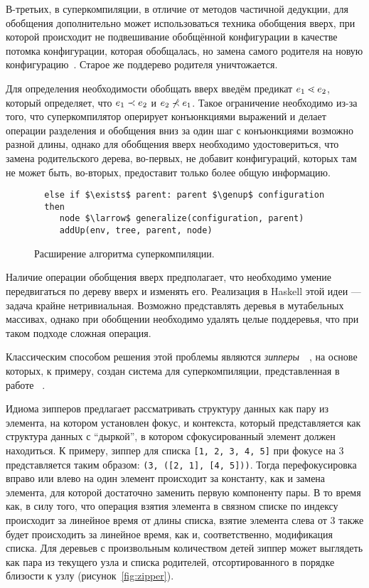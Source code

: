 
В-третьих, в суперкомпиляции, в отличие от методов частичной дедукции, для обобщения дополнительно может использоваться
техника обобщения вверх, при которой происходит не подвешивание обобщённой конфигурации
в качестве потомка конфигурации, которая обобщалась, но замена самого родителя на
новую конфигурацию~\cite{scPos}. Старое же поддерево родителя уничтожается.

Для определения необходимости обобщать вверх введём предикат $e_1 \lessdot e_2$,
который определяет, что $e_1 \prec e_2$ и $e_2 \not\prec e_1$.
Такое ограничение необходимо из-за того, что суперкомпилятор оперирует
конъюнкциями выражений и делает операции разделения и обобщения вниз
за один шаг с конъюнкциями возможно разной длины, однако для обобщения
вверх необходимо удостовериться, что замена родительского дерева, во-первых,
не добавит конфигураций, которых там не может быть, во-вторых, предоставит
только более общую информацию.

\begin{figure}[h!]
\begin{lstlisting}
  else if $\exists$ parent: parent $\genup$ configuration
  then
     node $\larrow$ generalize(configuration, parent)
     addUp(env, tree, parent, node)
\end{lstlisting}
\caption{Расширение алгоритма суперкомпиляции.}
\label{fig:scalgogenExtended}
\end{figure}

Наличие операции обобщения вверх предполагает, что необходимо умение передвигаться по дереву вверх и изменять его.
Реализация в Haskell этой идеи --- задача крайне нетривиальная. Возможно представлять
деревья в мутабельных массивах, однако при обобщении необходимо удалять целые поддеревья,
что при таком подходе сложная операция.

Классическим способом решения этой проблемы являются \emph{зипперы}~~\cite{zipper},
на основе которых, к примеру, создан система для суперкомпиляции,
представленная в работе ~\cite{optimus}.

Идиома зипперов предлагает рассматривать структуру данных как пару из элемента,
на котором установлен фокус, и контекста, который представляется как структура данных
с ``дыркой'', в котором сфокусированный элемент должен находиться.
К примеру, зиппер для списка \lstinline{[1, 2, 3, 4, 5]} при фокусе на 3 представляется
таким образом: \lstinline{(3, ([2, 1], [4, 5]))}.
Тогда перефокусировка вправо или влево на один элемент происходит за константу,
как и замена элемента, для которой достаточно заменить первую компоненту пары.
В то время как, в силу того, что операция взятия элемента в связном списке по индексу
происходит за линейное время от длины списка, взятие элемента слева от 3 также
будет происходить за линейное время, как и, соответственно, модификация списка.
Для деревьев с произвольным количеством детей зиппер может выглядеть
как пара из текущего узла и списка родителей, отсортированного в порядке
близости к узлу (рисунок~\ref{fig:zipper}).

